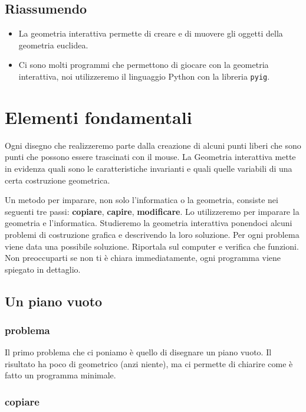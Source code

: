 \subsection{Riassumendo}
\begin{itemize} [nosep]
\item La geometria interattiva permette di creare e di muovere gli oggetti 
della geometria euclidea.
\item Ci sono molti programmi che permettono di giocare con la geometria
interattiva, noi utilizzeremo il linguaggio Python con la libreria 
\texttt{pyig}.
\end{itemize}

\section{Elementi fondamentali}
\label{sec:geo_int_elementi_fondamentali}

Ogni disegno che realizzeremo parte dalla creazione di alcuni punti liberi che 
sono punti che possono essere trascinati con il mouse. La Geometria interattiva 
mette in evidenza quali sono le caratteristiche invarianti e quali quelle 
variabili di una certa costruzione geometrica.

Un metodo per imparare, non solo l'informatica o la geometria, consiste nei 
seguenti tre passi: \textbf{copiare}, \textbf{capire}, \textbf{modificare}.
Lo utilizzeremo per imparare la geometria e l'informatica.
Studieremo la geometria interattiva ponendoci alcuni problemi di costruzione 
grafica e descrivendo la loro soluzione. Per ogni problema viene data una 
possibile soluzione. Riportala sul computer e verifica che funzioni. Non 
preoccuparti se non ti è chiara immediatamente, ogni programma viene spiegato 
in dettaglio. 

\subsection{Un piano vuoto}
\label{subsec:geo_int_pianovuoto}

\subsubsection{problema}

Il primo problema che ci poniamo è quello di disegnare un piano vuoto. Il 
risultato ha poco di geometrico (anzi niente), ma ci permette di chiarire come 
è fatto un programma minimale.

\subsubsection{copiare}

